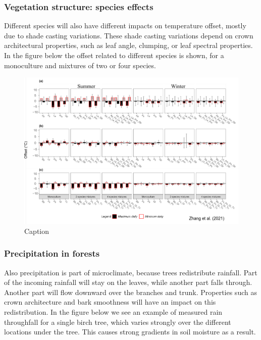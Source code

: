 \documentclass[12pt,oneside]{book}
\begin{document}
\subsubsection{Vegetation structure: species
effects}\label{vegetation-structure-species-effects}

Different species will also have different impacts on temperature
offset, mostly due to shade casting variations. These shade casting
variations depend on crown architectural properties, such as leaf angle,
clumping, or leaf spectral properties. In the figure below the offset
related to different species is shown, for a monoculture and mixtures of
two or four species.

\begin{figure}

{\centering \includegraphics[width=1\linewidth]{figures/Figure1022} 

}

\caption{Caption}\label{fig:Micro22}
\end{figure}

\subsubsection{Precipitation in forests}\label{precipitation-in-forests}

Also precipitation is part of microclimate, because trees redistribute
rainfall. Part of the incoming rainfall will stay on the leaves, while
another part falls through. Another part will flow downward over the
branches and trunk. Properties such as crown architecture and bark
smoothness will have an impact on this redistribution. In the figure
below we see an example of measured rain throughfall for a single birch
tree, which varies strongly over the different locations under the tree.
This causes strong gradients in soil moisture as a result.
\end{document}
